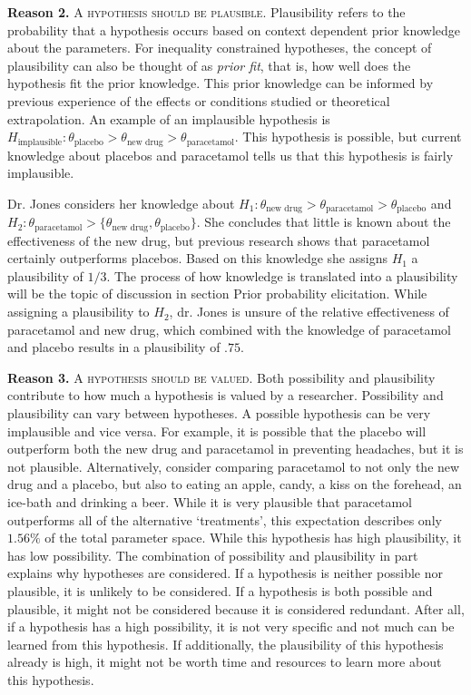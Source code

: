 \documentclass[man]{apa6}
\begin{document}
\noindent\textbf{Reason 2.} 
\textsc{A hypothesis should be plausible.}
Plausibility refers to the probability that a hypothesis occurs based on context dependent prior knowledge about the parameters.
For inequality constrained hypotheses, the concept of plausibility can also be thought of as \textit{prior fit}, that is, how well does the hypothesis fit the prior knowledge.
This prior knowledge can be informed by previous experience of the effects or conditions studied or theoretical extrapolation.
An example of an implausible hypothesis is $H_{\text{implausible}}: \theta_{\text{placebo}} > \theta_{\text{new drug}} > \theta_{\text{paracetamol}}$.
This hypothesis is possible, but current knowledge about placebos and paracetamol tells us that this hypothesis is fairly implausible.

Dr. Jones considers her knowledge about $H_1: \theta_\text{new drug} > \theta_\text{paracetamol} > \theta_\text{placebo}$ and $H_2: \theta_\text{paracetamol} > \{ \theta_\text{new drug}, \theta_\text{placebo} \}$.
She concludes that little is known about the effectiveness of the new drug, but previous research shows that paracetamol certainly outperforms placebos.
Based on this knowledge she assigns $H_1$ a plausibility of $1/3$.
The process of how knowledge is translated into a plausibility will be the topic of discussion in section Prior probability elicitation.
While assigning a plausibility to $H_2$, dr. Jones is unsure of the relative effectiveness of paracetamol and new drug, which combined with the knowledge of paracetamol and placebo results in a plausibility of $.75$.

\noindent\textbf{Reason 3.} 
\textsc{A hypothesis should be valued.}
Both possibility and plausibility contribute to how much a hypothesis is valued by a researcher.
Possibility and plausibility can vary between hypotheses.
A possible hypothesis can be very implausible and vice versa.
For example, it is possible that the placebo will outperform both the new drug and paracetamol in preventing headaches, but it is not plausible.
Alternatively, consider comparing paracetamol to not only the new drug and a placebo, but also to eating an apple, candy, a kiss on the forehead, an ice-bath and drinking a beer.
While it is very plausible that paracetamol outperforms all of the alternative `treatments', this expectation describes only $1.56\%$ of the total parameter space.
While this hypothesis has high plausibility, it has low possibility.
The combination of possibility and plausibility in part explains why hypotheses are considered.
If a hypothesis is neither possible nor plausible, it is unlikely to be considered.
If a hypothesis is both possible and plausible, it might not be considered because it is considered redundant.
After all, if a hypothesis has a high possibility, it is not very specific and not much can be learned from this hypothesis. 
If additionally, the plausibility of this hypothesis already is high, it might not be worth time and resources to learn more about this hypothesis.
\end{document}
